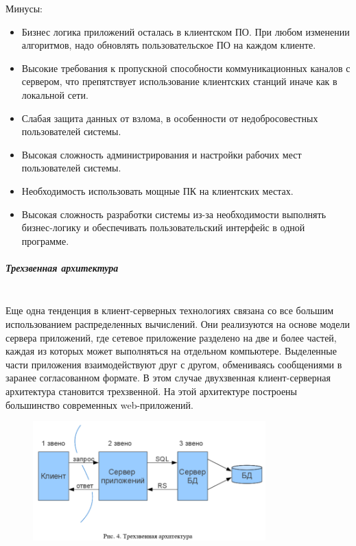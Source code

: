 Минусы:
\begin{itemize}
    \item 	Бизнес логика приложений осталась в клиентском ПО. При любом изменении алгоритмов, надо обновлять пользовательское ПО на каждом клиенте.
    \item Высокие требования к пропускной способности коммуникационных каналов с сервером, что препятствует использование клиентских станций иначе как в локальной сети.
    \item Слабая защита данных от взлома, в особенности от недобросовестных пользователей системы.
    \item Высокая сложность администрирования и настройки рабочих мест пользователей системы.
    \item Необходимость использовать мощные ПК на клиентских местах.
    \item Высокая сложность разработки системы из-за необходимости выполнять бизнес-логику и обеспечивать пользовательский интерфейс в одной программе.
\end{itemize}

\subparagraph{Трехзвенная архитектура}~\\

Еще одна тенденция в клиент-серверных технологиях связана со все большим
использованием распределенных вычислений. Они реализуются на основе модели сервера
приложений, где сетевое приложение разделено на две и более частей, каждая из которых
может выполняться на отдельном компьютере. Выделенные части приложения
взаимодействуют друг с другом, обмениваясь сообщениями в заранее согласованном
формате. В этом случае двухзвенная клиент-серверная архитектура становится
трехзвенной.  На этой архитектуре построены большинство современных web-приложений.~\\

\begin{figure}[h!]
    \centering
    \includegraphics[width=0.8\textwidth]{assets/664}
\end{figure}

